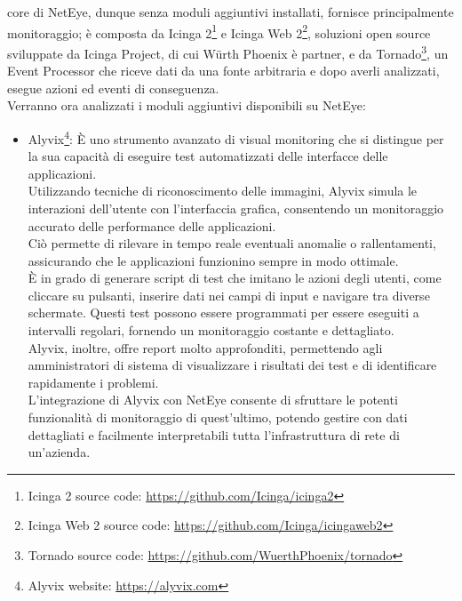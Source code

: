 core di NetEye, dunque senza moduli aggiuntivi installati, fornisce principalmente
monitoraggio; è composta da Icinga 2\footnote{Icinga 2 source code: \url{https://github.com/Icinga/icinga2}}
e Icinga Web 2\footnote{Icinga Web 2 source code: \url{https://github.com/Icinga/icingaweb2}},
soluzioni open source sviluppate da Icinga Project, di cui Würth Phoenix è
partner, e da Tornado\footnote{Tornado source code: \url{https://github.com/WuerthPhoenix/tornado}},
un Event Processor che riceve dati da una fonte arbitraria e dopo averli analizzati,
esegue azioni ed eventi di conseguenza.\\ Verranno ora analizzati i moduli
aggiuntivi disponibili su NetEye:
\begin{itemize}
  \item Alyvix\footnote{Alyvix website: \url{https://alyvix.com}}: È uno strumento
    avanzato di visual monitoring che si distingue per la sua capacità di eseguire
    test automatizzati delle interfacce delle applicazioni.\\ Utilizzando tecniche
    di riconoscimento delle immagini, Alyvix simula le interazioni dell'utente
    con l'interfaccia grafica, consentendo un monitoraggio accurato delle performance
    delle applicazioni.\\ Ciò permette di rilevare in tempo reale eventuali anomalie
    o rallentamenti, assicurando che le applicazioni funzionino sempre in modo
    ottimale.\\ È in grado di generare script di test che imitano le azioni
    degli utenti, come cliccare su pulsanti, inserire dati nei campi di input e
    navigare tra diverse schermate. Questi test possono essere programmati per essere
    eseguiti a intervalli regolari, fornendo un monitoraggio costante e
    dettagliato.\\ Alyvix, inoltre, offre report molto approfonditi, permettendo
    agli amministratori di sistema di visualizzare i risultati dei test e di identificare
    rapidamente i problemi.\\ L'integrazione di Alyvix con NetEye consente di sfruttare
    le potenti funzionalità di monitoraggio di quest'ultimo, potendo gestire con
    dati dettagliati e facilmente interpretabili tutta l'infrastruttura di rete
    di un'azienda.


\end{itemize}
